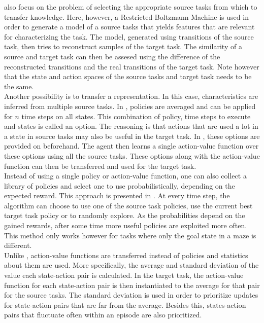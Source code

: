 \documentclass[a4paper, 11pt]{article}
\begin{document}
\cite{Ammar2014} also focus on the problem of selecting the appropriate source tasks from which to transfer knowledge. Here, however, a Restricted Boltzmann Machine \citep{Smolensky1986} is used in order to generate a model of a source tasks that yields features that are relevant for characterizing the task. The model, generated using transitions of the source task, then tries to reconstruct samples of the target task. The similarity of a source and target task can then be assesed using the difference of the reconstructed transitions and the real transitions of the target task. Note however that the state and action spaces of the source tasks and target task needs to be the same.\\

Another possibility is to transfer a representation. In this case, characteristics are inferred from multiple source tasks.
In \cite{Bernstein99reusingold}, policies are averaged and can be applied for $n$ time steps on all states. This combination of policy, time steps to execute and states is called an option. The reasoning is that actions that are used a lot in a state in source tasks may also be useful in the target task. In \cite{perkins1999using}, these options are provided on beforehand. The agent then learns a single action-value function over these options using all the source tasks. These options along with the action-value function can then be transferred and used for the target task.\\

Instead of using a single policy or action-value function, one can also collect a library of policies and select one to use probabilistically, depending on the expected reward. This approach is presented in \cite{fernandez2006probabilistic,fernandez2013learning}. At every time step, the algorithm can choose to use one of the source task policies, use the current best target task policy or to randomly explore. As the probabilities depend on the gained rewards, after some time more useful policies are exploited more often. This method only works however for tasks where only the goal state in a maze is different.\\

Unlike \cite{conf/cira/TanakaY03}, action-value functions are transferred instead of policies and statistics about them are used. More specifically, the average and standard deviation of the value each state-action pair is calculated. In the target task, the action-value function for each state-action pair is then instantiated to the average for that pair for the source tasks. The standard deviation is used in order to prioritize updates for state-action pairs that are far from the average. Besides this, states-action pairs that fluctuate often within an episode are also prioritized.\\
\end{document}
